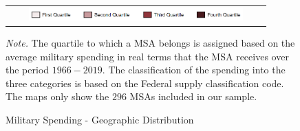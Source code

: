 \documentclass[dv_diss_main.tex]{subfiles}
\begin{document}
\begin{figure}[H]
\begin{center}
\begin{tabular}[c]{ccc}
    \multicolumn{3}{c}{\includegraphics[height=0.2in,width=3.8in]{figures/map_cbsa_legspend.png}} \\[0.1in]
      \end{tabular}
\end{center}
    \caption{Military Spending - Geographic Distribution}
    \footnotesize{\textit{Note. } The quartile to which a MSA belongs is assigned based on the average military spending in real terms that the MSA receives over the period $1966-2019$. The classification of the spending into the three categories is based on the Federal supply classification code. The maps only show the $296$ MSAs included in our sample.}
    \label{fig:map_spend}
\end{figure}
\newpage
\end{document}
